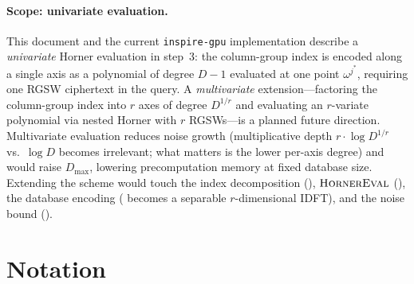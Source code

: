 \documentclass[11pt,a4paper]{article}
\begin{document}
\paragraph{Scope: univariate evaluation.}
This document and the current \texttt{inspire-gpu} implementation describe a \emph{univariate} Horner evaluation in step~3: the column-group index is encoded along a single axis as a polynomial of degree $D - 1$ evaluated at one point $\omega^{j^*}$, requiring one RGSW ciphertext in the query.
A \emph{multivariate} extension---factoring the column-group index into $r$ axes of degree $D^{1/r}$ and evaluating an $r$-variate polynomial via nested Horner with $r$ RGSWs---is a planned future direction.
Multivariate evaluation reduces noise growth (multiplicative depth $r \cdot \log D^{1/r}$ vs.\ $\log D$ becomes irrelevant; what matters is the lower per-axis degree) and would raise $D_{\max}$, lowering precomputation memory at fixed database size.
Extending the scheme would touch the index decomposition (), $\textsc{HornerEval}$ (), the database encoding ( becomes a separable $r$-dimensional IDFT), and the noise bound ().

\section{Notation}\label{sec:notation}
\end{document}
